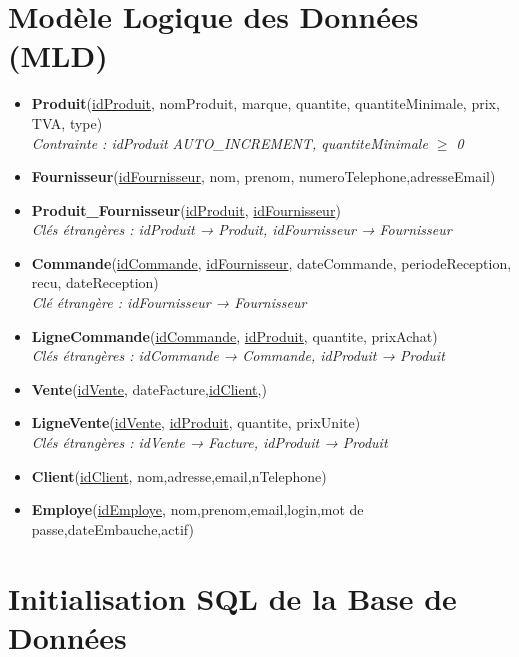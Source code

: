 \documentclass[12pt]{article}
\begin{document}
\section{Modèle Logique des Données (MLD)}

\begin{itemize}[label=--]
  \item \textbf{Produit}(\underline{idProduit}, nomProduit, marque, quantite, quantiteMinimale, prix, TVA, type)\\
    \textit{Contrainte : idProduit AUTO\_INCREMENT, quantiteMinimale $\geq$ 0}
  \item \textbf{Fournisseur}(\underline{idFournisseur}, nom, prenom, numeroTelephone,adresseEmail)
  \item \textbf{Produit\_Fournisseur}(\underline{idProduit}, \underline{idFournisseur})\\
    \textit{Clés étrangères : idProduit → Produit, idFournisseur → Fournisseur}
  \item \textbf{Commande}(\underline{idCommande}, \underline{idFournisseur}, dateCommande, periodeReception, recu, dateReception)\\
    \textit{Clé étrangère : idFournisseur → Fournisseur}
  \item \textbf{LigneCommande}(\underline{idCommande}, \underline{idProduit}, quantite, prixAchat)\\
    \textit{Clés étrangères : idCommande → Commande, idProduit → Produit}
  \item \textbf{Vente}(\underline{idVente}, dateFacture,\underline{idClient},)
  \item \textbf{LigneVente}(\underline{idVente}, \underline{idProduit}, quantite, prixUnite)\\
    \textit{Clés étrangères : idVente → Facture, idProduit → Produit}
 \item \textbf{Client}(\underline{idClient}, nom,adresse,email,nTelephone)
 \item \textbf{Employe}(\underline{idEmploye}, nom,prenom,email,login,mot de passe,dateEmbauche,actif)
\end{itemize}
\section{Initialisation SQL de la Base de Données}
\end{document}
